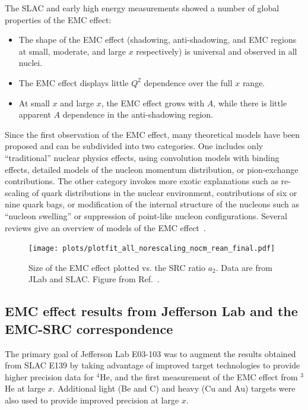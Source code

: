 The SLAC and early high energy measurements showed a number of global properties of the EMC effect:
%
\begin{itemize}
\item{The shape of the EMC effect (shadowing, anti-shadowing, and EMC regions at small, moderate, and large $x$ respectively) is universal and observed in all nuclei.}
\item{The EMC effect displays little $Q^2$ dependence over the full $x$ range.}
\item{At small $x$ and large $x$, the EMC effect grows with $A$, while there is little apparent $A$ dependence in the anti-shadowing region.}
\end{itemize}
%
Since the first observation of the EMC effect, many theoretical models have been proposed and can be subdivided into two categories.  One includes only ``traditional'' nuclear physics effects, using convolution models with binding effects, detailed models of the nucleon momentum distribution, or pion-exchange contributions. The other category invokes more exotic explanations such as re-scaling of quark distributions in the nuclear environment, contributions of six or nine
quark bags, or modification of the internal structure of the nucleons such as ``nucleon swelling'' or suppression of point-like nucleon configurations. Several reviews give an overview of models of the EMC effect~\cite{Geesaman:1995yd, Piller:1999wx, Malace:2014uea, Norton:2003cb,  Hen:2013oha}.


\begin{figure}[tbp]
\centering\texttt{[image: plots/plotfit\_all\_norescaling\_nocm\_rean\_final.pdf]}
\caption{Size of the EMC effect plotted vs. the SRC ratio $a_2$. Data are from JLab and SLAC. Figure
from Ref.~\cite{Arrington:2012ax}.}
\label{fig:emc_src_bff}
\end{figure}

\subsection{EMC effect results from Jefferson Lab and the EMC-SRC correspondence}

The primary goal of Jefferson Lab E03-103 was to augment the results obtained from SLAC E139 by taking
advantage of improved target technologies to provide higher precision data for $^4$He, and the first
measurement of the EMC effect from $^3$He at large $x$.  Additional light (Be and C) and heavy (Cu and Au)
targets were also used to provide improved precision at large $x$.

